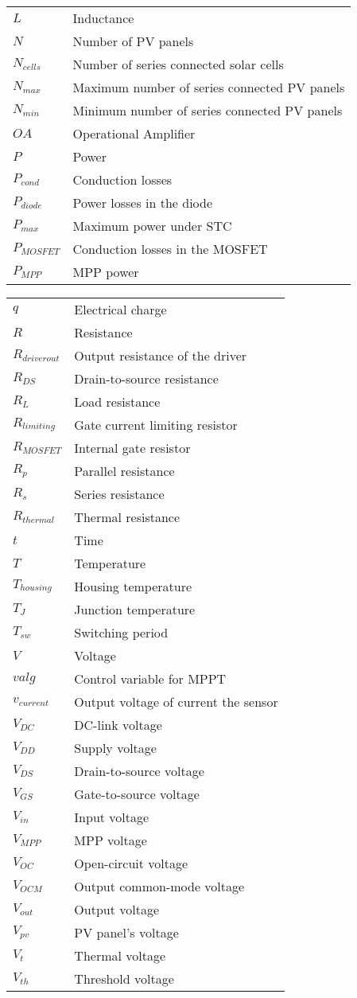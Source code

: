 \begin{tabular}{ll}
$L$ & Inductance\\
$N$ & Number of PV panels \\
$N_{cells}$ & Number of series connected solar cells \\ 
$N_{max}$ & Maximum number of series connected PV panels \\
$N_{min}$ & Minimum number of series connected PV panels \\
$OA$ & Operational Amplifier \\
$P$ & Power\\
$P_{cond}$ & Conduction losses \\
$P_{diode}$ & Power losses in the diode \\
$P_{max}$ & Maximum power under STC\\
$P_{MOSFET}$ & Conduction losses in the MOSFET \\
$P_{MPP}$ & MPP power \\
\end{tabular}
\newpage

\begin{tabular}{ll}
$q$ & Electrical charge \\
$R$ & Resistance\\
$R_{driver out}$ & Output resistance of the driver\\
$R_{DS}$ & Drain-to-source resistance\\
$R_{L}$ & Load resistance\\
$R_{limiting}$ & Gate current limiting resistor\\ 
$R_{MOSFET}$ & Internal gate resistor\\
$R_{p}$ & Parallel resistance \\
$R_{s}$ & Series resistance \\
$R_{thermal}$ & Thermal resistance\\
$t$ & Time\\
$T$ & Temperature \\
$T_{housing}$ & Housing temperature \\
$T_{J}$ & Junction temperature \\
$T_{sw}$ & Switching period \\
$V$ & Voltage\\
$valg$ & Control variable for MPPT \\
$v_{current}$ & Output voltage of current the sensor \\
$V_{DC}$ & DC-link voltage \\
$V_{DD}$ & Supply voltage\\
$V_{DS}$ & Drain-to-source voltage\\
$V_{GS}$ & Gate-to-source voltage\\
$V_{in}$ & Input voltage \\
$V_{MPP}$ & MPP voltage\\
$V_{OC}$ & Open-circuit voltage\\
$V_{OCM}$ & Output common-mode voltage \\
$V_{out}$ & Output voltage \\
$V_{pv}$ & PV panel's voltage \\
$V_{t}$ & Thermal voltage \\
$V_{th}$ & Threshold voltage \\
\end{tabular}
